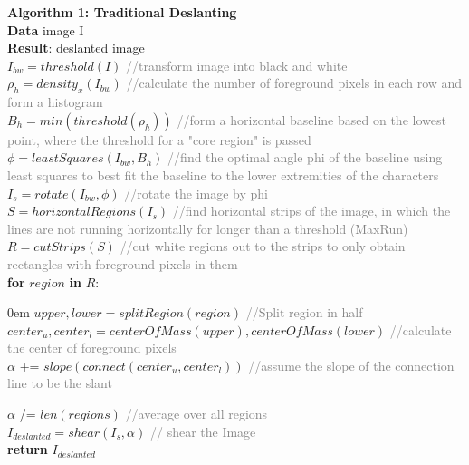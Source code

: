 \documentclass{article}
\begin{document}
\begin{algorithm}	
\textbf{Algorithm 1: Traditional Deslanting} \\
\textbf{Data} image I \\
\textbf{Result}: deslanted image \\
$I_{bw} = threshold(I)$ \textcolor{gray}{//transform image into black and white} \\
$\rho_h = density_x(I_{bw})$ \textcolor{gray}{//calculate the number of foreground pixels in each row and form a histogram} \\
$B_h = min(threshold(\rho_h))$ \textcolor{gray}{//form a horizontal baseline based on the lowest point, where the threshold for a "core region" is passed} \\
$\phi = leastSquares(I_{bw}, B_h)$ \textcolor{gray}{//find the optimal angle phi of the baseline using least squares to best fit the baseline to the lower extremities of the characters} \\
$I_s = rotate(I_{bw}, \phi)$ \textcolor{gray}{//rotate the image by phi} \\
$S = horizontalRegions(I_s)$ \textcolor{gray}{//find horizontal strips of the image, in which the lines are not running horizontally for longer than a threshold (MaxRun)} \\
$R = cutStrips(S)$ \textcolor{gray}{//cut white regions out to the strips to only obtain rectangles with foreground pixels in them} \\
\textbf{for} $region$ \textbf{in} $R$: 
\begin{addmargin}[1em] {0em}%
$upper, lower = splitRegion(region)$ \textcolor{gray}{//Split region in half} \\
$center_u, center_l = centerOfMass(upper), centerOfMass(lower)$ \textcolor{gray}{//calculate the center of foreground pixels} \\
$\alpha$ += $slope(connect(center_u, center_l))$ \textcolor{gray}{//assume the slope of the connection line to be the slant}
\end{addmargin}
$\alpha$ /= $len(regions)$ \textcolor{gray}{//average over all regions} \\
$I_{deslanted} = shear(I_s, \alpha)$ \textcolor{gray}{// shear the Image} \\
\textbf{return }$I_{deslanted}$
\end{algorithm}
\end{document}
